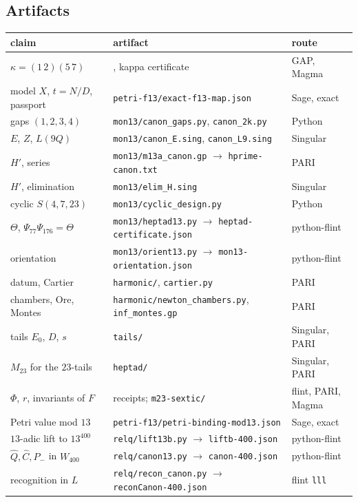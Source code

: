 \documentclass[11pt]{amsart}
\newif\ifrelqclosed
\newcommand{\Mtw}{M_{23}}
\newcommand{\kap}{\kappa}
\theoremstyle{plain}
\theoremstyle{definition}
\begin{document}
\subsection*{Artifacts}
{\footnotesize
\begin{center}
\begin{tabular}{@{}lll@{}}
\toprule
claim & artifact & route\\
\midrule
$\kap=(1\,2)(5\,7)$ & \cite{seven}, kappa certificate & GAP, Magma\\
model $X$, $t=N/D$, passport & \texttt{petri-f13/exact-f13-map.json} & Sage, exact\\
gaps $(1,2,3,4)$ & \texttt{mon13/canon\_gaps.py}, \texttt{canon\_2k.py} & Python\\
$E$, $Z$, $L(9Q)$ & \texttt{mon13/canon\_E.sing}, \texttt{canon\_L9.sing} & Singular\\
$H'$, series & \texttt{mon13/m13a\_canon.gp} $\to$ \texttt{hprime-canon.txt} & PARI\\
$H'$, elimination & \texttt{mon13/elim\_H.sing} & Singular\\
cyclic $S(4,7,23)$ & \texttt{mon13/cyclic\_design.py} & Python\\
$\Theta$, $\Psi_{77}\Psi_{176}=\Theta$ & \texttt{mon13/heptad13.py} $\to$ \texttt{heptad-certificate.json} & python-flint\\
orientation & \texttt{mon13/orient13.py} $\to$ \texttt{mon13-orientation.json} & python-flint\\
datum, Cartier & \texttt{harmonic/}, \texttt{cartier.py} & PARI\\
chambers, Ore, Montes & \texttt{harmonic/newton\_chambers.py}, \texttt{inf\_montes.gp} & PARI\\
tails $E_0$, $D$, $s$ & \texttt{tails/} & Singular, PARI\\
$\Mtw$ for the $23$-tails & \texttt{heptad/} & Singular, PARI\\
$\Phi$, $r$, invariants of $F$ & \cite{seven} receipts; \texttt{m23-sextic/} & flint, PARI, Magma\\
Petri value mod $13$ & \texttt{petri-f13/petri-binding-mod13.json} & Sage, exact\\
\ifrelqclosed
$13$-adic lift to $13^{400}$ & \texttt{relq/lift13b.py} $\to$ \texttt{liftb-400.json} & python-flint\\
$\hat Q,\hat C,P_-$ in $W_{400}$ & \texttt{relq/canon13.py} $\to$ \texttt{canon-400.json} & python-flint\\
recognition in $L$ & \texttt{relq/recon\_canon.py} $\to$ \texttt{reconCanon-400.json} & flint \texttt{lll}\\

\end{tabular}
\end{center}}
\end{document}
